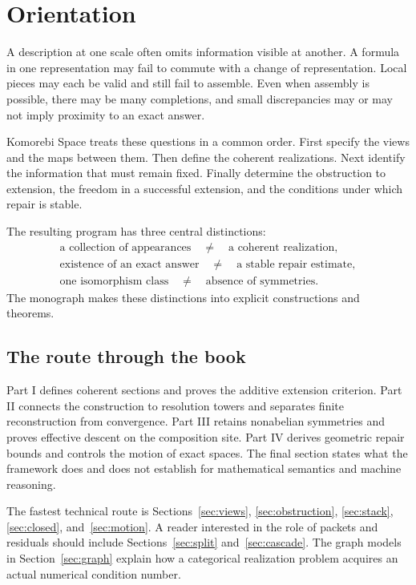 \documentclass[11pt]{article}
\begin{document}
\clearpage
\section*{Orientation}
A description at one scale often omits information visible at another. A formula in one representation may fail to commute with a change of representation. Local pieces may each be valid and still fail to assemble. Even when assembly is possible, there may be many completions, and small discrepancies may or may not imply proximity to an exact answer.

Komorebi Space treats these questions in a common order. First specify the views and the maps between them. Then define the coherent realizations. Next identify the information that must remain fixed. Finally determine the obstruction to extension, the freedom in a successful extension, and the conditions under which repair is stable.

The resulting program has three central distinctions:
\[
\begin{gathered}
\text{a collection of appearances}\quad\ne\quad\text{a coherent realization},\\
\text{existence of an exact answer}\quad\ne\quad\text{a stable repair estimate},\\
\text{one isomorphism class}\quad\ne\quad\text{absence of symmetries}.
\end{gathered}
\]
The monograph makes these distinctions into explicit constructions and theorems.

\subsection*{The route through the book}
Part I defines coherent sections and proves the additive extension criterion. Part II connects the construction to resolution towers and separates finite reconstruction from convergence. Part III retains nonabelian symmetries and proves effective descent on the composition site. Part IV derives geometric repair bounds and controls the motion of exact spaces. The final section states what the framework does and does not establish for mathematical semantics and machine reasoning.

The fastest technical route is Sections~\ref{sec:views}, \ref{sec:obstruction}, \ref{sec:stack}, \ref{sec:closed}, and~\ref{sec:motion}. A reader interested in the role of packets and residuals should include Sections~\ref{sec:split} and~\ref{sec:cascade}. The graph models in Section~\ref{sec:graph} explain how a categorical realization problem acquires an actual numerical condition number.
\end{document}
